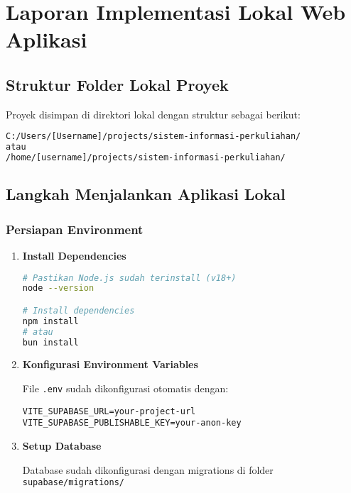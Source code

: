 \documentclass[12pt,a4paper]{article}
\begin{document}
\newpage
\section{Laporan Implementasi Lokal Web Aplikasi}

\subsection{Struktur Folder Lokal Proyek}

Proyek disimpan di direktori lokal dengan struktur sebagai berikut:

\begin{lstlisting}[language=bash]
C:/Users/[Username]/projects/sistem-informasi-perkuliahan/
atau
/home/[username]/projects/sistem-informasi-perkuliahan/
\end{lstlisting}

\subsection{Langkah Menjalankan Aplikasi Lokal}

\subsubsection{Persiapan Environment}

\begin{enumerate}
    \item \textbf{Install Dependencies}
    \begin{lstlisting}[language=bash]
# Pastikan Node.js sudah terinstall (v18+)
node --version

# Install dependencies
npm install
# atau
bun install
    \end{lstlisting}
    
    \item \textbf{Konfigurasi Environment Variables}
    
    File \texttt{.env} sudah dikonfigurasi otomatis dengan:
    \begin{lstlisting}
VITE_SUPABASE_URL=your-project-url
VITE_SUPABASE_PUBLISHABLE_KEY=your-anon-key
    \end{lstlisting}
    
    \item \textbf{Setup Database}
    
    Database sudah dikonfigurasi dengan migrations di folder \texttt{supabase/migrations/}
\end{enumerate}
\end{document}
